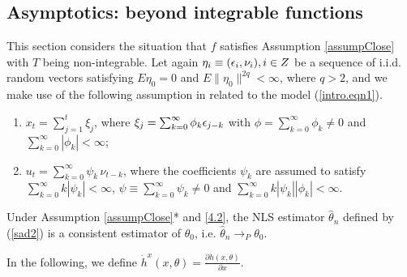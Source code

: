 \subsection{Asymptotics: beyond integrable functions} 

This section considers the situation that $f$ satisfies Assumption \ref{assumpClose} with $T$ being non-integrable. Let again $\eta_i\equiv (\epsilon_i, \nu_i), i\in Z $ be a sequence of i.i.d. random vectors satisfying $E\eta_0=0$ and $E\|\eta_0\|^{2q}<\infty$, where $q > 2$, and we make use of the following assumption in related to the model (\ref {intro.eqn1}).



\begin{assump}
\begin{enumerate}[label=(\roman{*}), leftmargin=*, widest=0] \itemsep0pt \parskip0pt 
 \item $x_t=\sum_{j=1}^t\xi_j$, where  $\xi_j=\sum_{k=0}^{\infty}\phi_k\epsilon_{j-k}$  with $\phi=\sum_{k=0}^{\infty}\phi_k\not=0$ and $\sum_{k=0}^{\infty}|\phi_k|<\infty$;
\item $u_t= \sum_{k=0}^{\infty}\psi_k\, \nu_{t-k}$, where the coefficients $\psi_k$ are assumed to satisfy  $\sum_{k=0}^{\infty}k |\psi_k|<\infty$, $ \psi \equiv  \sum_{k=0}^{\infty}\psi_k\not= 0$ and $\sum_{k=0}^{\infty} k|\psi_k| | \phi_k|< \infty$.
\end{enumerate}
\end{assump}



\begin{thm}  Under Assumption \ref{assumpClose}* and \ref {4.2}, the NLS estimator $\hat{\theta}_n$ defined by (\ref {sad2}) is a consistent estimator of $\theta_0$, i.e. $\hat{\theta}_n \rightarrow_P \theta_0$.
\end{thm}


In the following, we define $\dot{h}^x(x, \theta)=\frac {\partial \dot{h}(x, \theta)}{\partial x}.$


